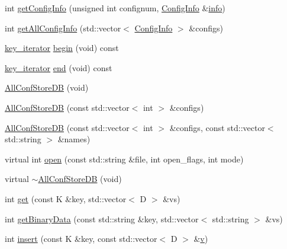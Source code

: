 \begin{DoxyCompactItemize}
\item 
int \mbox{\hyperlink{classFILEDB_1_1AllConfStoreDB_a351639b9e19297abfa7b8b1aca013770}{get\+Config\+Info}} (unsigned int confignum, \mbox{\hyperlink{classFILEDB_1_1ConfigInfo}{Config\+Info}} \&\mbox{\hyperlink{structinfo}{info}})
\item 
int \mbox{\hyperlink{classFILEDB_1_1AllConfStoreDB_aeb8e6daf1a1f9b7a19899cf7db365632}{get\+All\+Config\+Info}} (std\+::vector$<$ \mbox{\hyperlink{classFILEDB_1_1ConfigInfo}{Config\+Info}} $>$ \&configs)
\item 
\mbox{\hyperlink{classFILEDB_1_1AllConfStoreDB_a2ce8981ca7049ed0c2c6e438873a9c1b}{key\+\_\+iterator}} \mbox{\hyperlink{classFILEDB_1_1AllConfStoreDB_a7bb7f812d80471897860af5692eb5bd2}{begin}} (void) const
\item 
\mbox{\hyperlink{classFILEDB_1_1AllConfStoreDB_a2ce8981ca7049ed0c2c6e438873a9c1b}{key\+\_\+iterator}} \mbox{\hyperlink{classFILEDB_1_1AllConfStoreDB_a213c914b326e7769411e305ceb375b1d}{end}} (void) const
\item 
\mbox{\hyperlink{classFILEDB_1_1AllConfStoreDB_a72b72501b29029e2bfb682565f96eac0}{All\+Conf\+Store\+DB}} (void)
\item 
\mbox{\hyperlink{classFILEDB_1_1AllConfStoreDB_a9a8553b0ce3ac82be098130d08f62162}{All\+Conf\+Store\+DB}} (const std\+::vector$<$ int $>$ \&configs)
\item 
\mbox{\hyperlink{classFILEDB_1_1AllConfStoreDB_ab8b213578395f0ac7d436a82f4a26fe1}{All\+Conf\+Store\+DB}} (const std\+::vector$<$ int $>$ \&configs, const std\+::vector$<$ std\+::string $>$ \&names)
\item 
virtual int \mbox{\hyperlink{classFILEDB_1_1AllConfStoreDB_aa6e6deb3c33076d16db4ac0560f0d75f}{open}} (const std\+::string \&file, int open\+\_\+flags, int mode)
\item 
virtual \mbox{\hyperlink{classFILEDB_1_1AllConfStoreDB_ac5fe65eab60f20d7b8124c69c0bd5923}{$\sim$\+All\+Conf\+Store\+DB}} (void)
\item 
int \mbox{\hyperlink{classFILEDB_1_1AllConfStoreDB_a848466f7dce25cacc4e8560c50240d35}{get}} (const K \&key, std\+::vector$<$ D $>$ \&vs)
\item 
int \mbox{\hyperlink{classFILEDB_1_1AllConfStoreDB_aa923faf368f0aa7d327c2a3702d261c1}{get\+Binary\+Data}} (const std\+::string \&key, std\+::vector$<$ std\+::string $>$ \&vs)
\item 
int \mbox{\hyperlink{classFILEDB_1_1AllConfStoreDB_abf4a1ccd7306de436ba1ec61b242e02f}{insert}} (const K \&key, const std\+::vector$<$ D $>$ \&\mbox{\hyperlink{adat__devel_2lib_2hadron_2hadron__timeslice_8cc_a716fc87f5e814be3ceee2405ed6ff22a}{v}})

\end{DoxyCompactItemize}
